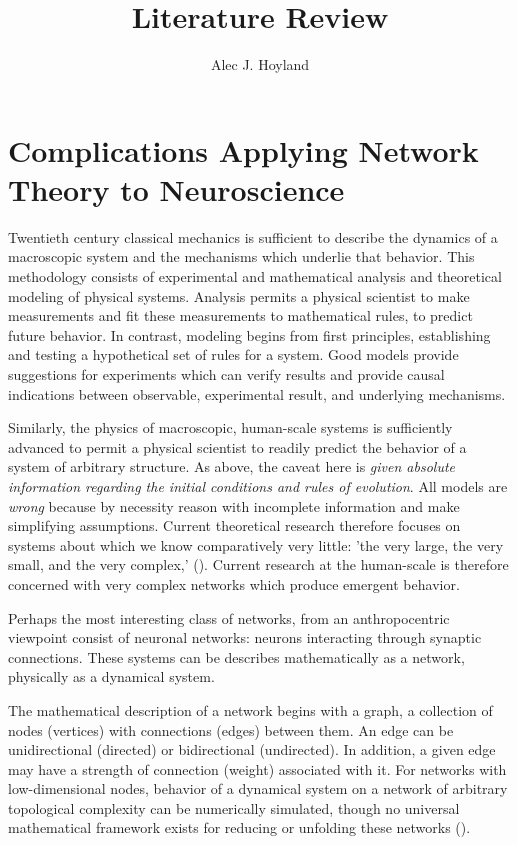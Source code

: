 \documentclass[14pt]{article}
\begin{document}
	
	\title{Literature Review}
	\author{Alec J. Hoyland}
	
	\maketitle
	\doublespacing
	
	\section{Complications Applying Network Theory to Neuroscience}
	
	Twentieth century classical mechanics is sufficient to describe the dynamics of a macroscopic system and the mechanisms which underlie that behavior. This methodology consists of experimental and mathematical analysis and theoretical modeling of physical systems. Analysis permits a physical scientist to make measurements and fit these measurements to mathematical rules, to predict future behavior. In contrast, modeling begins from first principles, establishing and testing a hypothetical set of rules for a system. Good models provide suggestions for experiments which can verify results and provide causal indications between observable, experimental result, and underlying mechanisms.
	
	Similarly, the physics of macroscopic, human-scale systems is sufficiently advanced to permit a physical scientist to readily predict the behavior of a system of arbitrary structure. As above, the caveat here is \textit{given absolute information regarding the initial conditions and rules of evolution}. All models are \textit{wrong} because by necessity reason with incomplete information and make simplifying assumptions. Current theoretical research therefore focuses on systems about which we know comparatively very little: 'the very large, the very small, and the very complex,' (\cite{FeynmanFeynmanLecturesPhysics2013}). Current research at the human-scale is therefore concerned with very complex networks which produce emergent behavior.
	
	Perhaps the most interesting class of networks, from an anthropocentric viewpoint consist of neuronal networks: neurons interacting through synaptic connections. These systems can be describes mathematically as a network, physically as a dynamical system.
	
	The mathematical description of a network begins with a graph, a collection of nodes (vertices) with connections (edges) between them. An edge can be unidirectional (directed) or bidirectional (undirected). In addition, a given edge may have a strength of connection (weight) associated with it. For networks with low-dimensional nodes, behavior of a dynamical system on a network of arbitrary topological complexity can be numerically simulated, though no universal mathematical framework exists for reducing or unfolding these networks (\cite{BarabasiScaleFreeNetworksDecade2009}).
	
\end{document}
